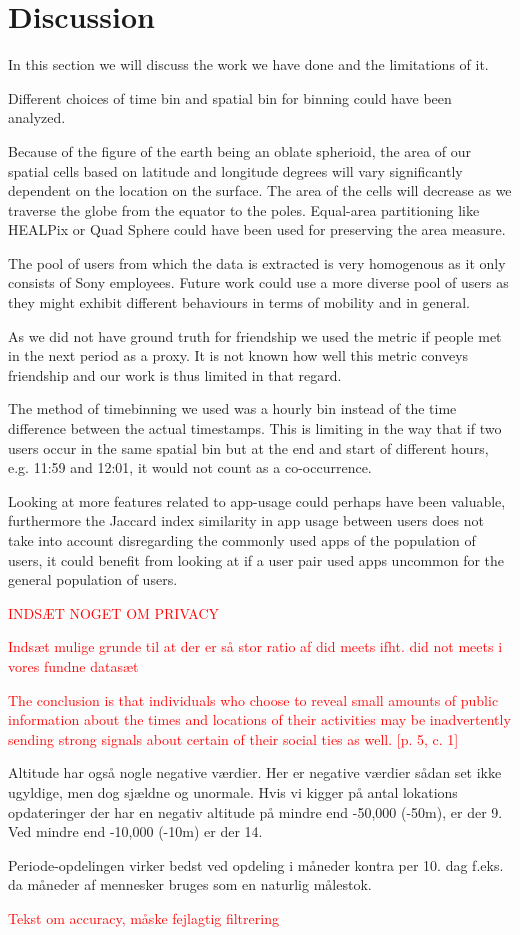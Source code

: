 \chapter{Discussion}
\label{chap:discussion}
In this section we will discuss the work we have done and the limitations of it.

Different choices of time bin and spatial bin for binning could have been analyzed.

Because of the figure of the earth being an oblate spherioid, the area of our spatial cells based on latitude and longitude degrees will vary significantly dependent on the location on the surface. The area of the cells will decrease as we traverse the globe from the equator to the poles. Equal-area partitioning like HEALPix or Quad Sphere could have been used for preserving the area measure.

The pool of users from which the data is extracted is very homogenous as it only consists of Sony employees. Future work could use a more diverse pool of users as they might exhibit different behaviours in terms of mobility and in general.

As we did not have ground truth for friendship we used the metric if people met in the next period as a proxy. It is not known how well this metric conveys friendship and our work is thus limited in that regard.

The method of timebinning we used was a hourly bin instead of the time difference between the actual timestamps. This is limiting in the way that if two users occur in the same spatial bin but at the end and start of different hours, e.g. 11:59 and 12:01, it would not count as a co-occurrence.

Looking at more features related to app-usage could perhaps have been valuable, furthermore the Jaccard index similarity in app usage between users does not take into account disregarding the commonly used apps of the population of users, it could benefit from looking at if a user pair used apps uncommon for the general population of users.

\textcolor{red}{INDSÆT NOGET OM PRIVACY}

\textcolor{red}{Indsæt mulige grunde til at der er så stor ratio af did meets ifht. did not meets i vores fundne datasæt}

\textcolor{red}{The conclusion is that individuals who choose to reveal small amounts of public information about the times and locations of their activities may be inadvertently sending strong signals about certain of their social ties as well. [p. 5, c. 1]}


Altitude har også nogle negative værdier. Her er negative værdier sådan set ikke ugyldige, men dog sjældne og unormale. Hvis vi kigger på antal lokations opdateringer der har en negativ altitude på mindre end -50,000 (-50m), er der 9. Ved mindre end -10,000 (-10m) er der 14.

Periode-opdelingen virker bedst ved opdeling i måneder kontra per 10. dag f.eks. da måneder af mennesker bruges som en naturlig målestok.

\textcolor{red}{Tekst om accuracy, måske fejlagtig filtrering}